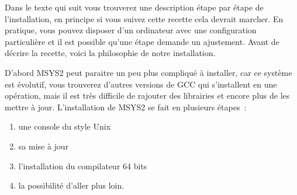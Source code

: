 \documentclass{article}
\begin{document}
Dans le texte qui suit vous trouverez une description étape par étape de l'installation, en principe si vous suivez cette recette cela devrait marcher. En pratique, vous pouvez disposer d'un ordinateur avec une configuration particulière et il est possible qu'une étape demande un ajustement. Avant de décrire la recette, voici la philosophie de notre installation. 

D'abord MSYS2 peut paraitre un peu plus compliqué à installer, car ce système est évolutif, vous trouverez d'autres versions de GCC qui s'installent en une opération, mais il est très difficile de rajouter des librairies et encore plus de les mettre à jour. L'installation de MSYS2 se fait en plusieurs étapes :
\begin{enumerate}
\item une console du style Unix
\item sa mise à jour
\item l'installation du compilateur 64 bits
\item la possibilité d'aller plus loin.
\end{enumerate}
 
\end{document}
